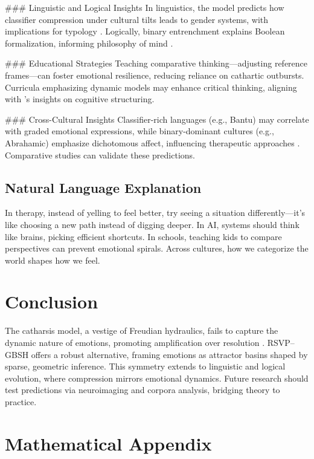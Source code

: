 \documentclass[11pt]{article}
\theoremstyle{plain}
\begin{document}
### Linguistic and Logical Insights
In linguistics, the model predicts how classifier compression under cultural tilts leads to gender systems, with implications for typology \citep{Aikhenvald2000}. Logically, binary entrenchment explains Boolean formalization, informing philosophy of mind \citep{Boole1854}.

### Educational Strategies
Teaching comparative thinking—adjusting reference frames—can foster emotional resilience, reducing reliance on cathartic outbursts. Curricula emphasizing dynamic models may enhance critical thinking, aligning with \citet{Goody1977}’s insights on cognitive structuring.

### Cross-Cultural Insights
Classifier-rich languages (e.g., Bantu) may correlate with graded emotional expressions, while binary-dominant cultures (e.g., Abrahamic) emphasize dichotomous affect, influencing therapeutic approaches \citep{Aikhenvald2000}. Comparative studies can validate these predictions.

\subsection{Natural Language Explanation}
In therapy, instead of yelling to feel better, try seeing a situation differently—it’s like choosing a new path instead of digging deeper. In AI, systems should think like brains, picking efficient shortcuts. In schools, teaching kids to compare perspectives can prevent emotional spirals. Across cultures, how we categorize the world shapes how we feel.

\section{Conclusion}

The catharsis model, a vestige of Freudian hydraulics, fails to capture the dynamic nature of emotions, promoting amplification over resolution \citep{Douglas1966}. RSVP–GBSH offers a robust alternative, framing emotions as attractor basins shaped by sparse, geometric inference. This symmetry extends to linguistic and logical evolution, where compression mirrors emotional dynamics. Future research should test predictions via neuroimaging and corpora analysis, bridging theory to practice.

\newpage
\appendix

\section{Mathematical Appendix}
\end{document}
